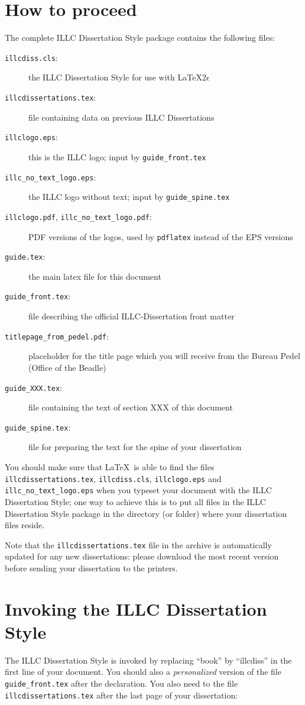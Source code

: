 \section{How to proceed}
The complete ILLC Dissertation Style package contains the following files:
\begin{description} 
\item[{\tt illcdiss.cls}:] the ILLC Dissertation Style for
use with \LaTeX 2$\epsilon$
\item[{\tt illcdissertations.tex}:] file containing data on previous
  ILLC Dissertations
\item[{\tt illclogo.eps}:] this is the ILLC logo;
  input by {\tt guide\_front.tex}
\item[{\tt illc\_no\_text\_logo.eps}:] the ILLC logo without text;
  input by {\tt guide\_spine.tex}
\item[{\tt illclogo.pdf}, {\tt illc\_no\_text\_logo.pdf}:] PDF versions of the logos, used by {\tt pdflatex} instead of the EPS versions
\item[{\tt guide.tex}:] the main latex file for this document
\item[{\tt guide\_front.tex}:] file describing the official 
  ILLC-Dissertation front matter
\item[{\tt titlepage\_from\_pedel.pdf}:] placeholder for the title page which you will receive from the Bureau Pedel (Office of the Beadle)
\item[{\tt guide\_XXX.tex}:] file containing the text of section XXX of this 
document
\item[{\tt guide\_spine.tex}:] file for preparing the text 
  for the spine of your dissertation
\end{description}
You should make sure that \LaTeX\ is able to find the files
{\tt illcdissertations.tex}, {\tt illcdiss.cls}, {\tt illclogo.eps} and
{\tt illc\_no\_text\_logo.eps} when you 
typeset your document with the ILLC Dissertation Style; one way
to achieve this is to put all files in the ILLC Dissertation Style
package in the directory (or folder) where your dissertation files
reside.

Note that the {\tt illcdissertations.tex}
file in the archive is automatically updated for any new dissertations:
please download the most recent version 
before sending your dissertation to the printers.

\section{Invoking the ILLC Dissertation Style}
The ILLC Dissertation Style is invoked by replacing ``book'' by ``illcdiss''
in the first line of your document. You should also \verb|| 
a {\em personalized\/} version of the file {\tt guide\_front.tex} 
after the \verb|| declaration. 
You also need to \verb|| the file
\verb|illcdissertations.tex| after the last page of your dissertation:

